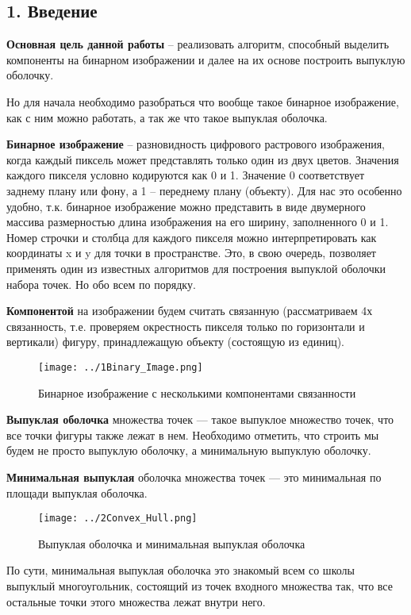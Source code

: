 \documentclass{report}
\begin{document}
\setcounter{page}{2}
\tableofcontents

\newpage


\begin{center}
\section*{1. Введение}
\end{center}
\par \textbf{Основная цель данной работы} – реализовать алгоритм, способный выделить компоненты на бинарном изображении и далее на их основе построить выпуклую оболочку.
\par Но для начала необходимо разобраться что вообще такое бинарное изображение, как с ним можно работать, а так же что такое выпуклая оболочка.
\par \textbf{Бинарное изображение} – разновидность цифрового растрового изображения, когда каждый пиксель может представлять только один из двух цветов. Значения каждого пикселя условно кодируются как 0 и 1. Значение 0 соответствует заднему плану или фону, а 1 – переднему плану (объекту). Для нас это особенно удобно, т.к. бинарное изображение можно представить в виде двумерного массива размерностью длина изображения на его ширину, заполненного 0 и 1. Номер строчки и столбца для каждого пикселя можно интерпретировать как координаты x и y для точки в пространстве. Это, в свою очередь, позволяет применять один из известных алгоритмов для построения выпуклой оболочки набора точек. Но обо всем по порядку. 
\par \textbf{Компонентой} на изображении будем считать связанную (рассматриваем 4х связанность, т.е. проверяем окрестность пикселя только по горизонтали и вертикали) фигуру, принадлежащую объекту (состоящую из единиц). 
\begin{figure}[htbp]
  \centering
  \texttt{[image: ../1Binary\_Image.png]}
  \caption{Бинарное изображение с несколькими компонентами связанности}\label{fig:../1Binary_Image.png}
\end{figure}
\par \textbf{Выпуклая оболочка} множества точек — такое выпуклое множество точек, что все точки фигуры также лежат в нем. Необходимо отметить, что строить мы будем не просто выпуклую оболочку, а минимальную выпуклую оболочку.
\par \textbf{Минимальная выпуклая} оболочка множества точек — это минимальная по площади выпуклая оболочка.
\begin{figure}[htbp]
  \centering
  \texttt{[image: ../2Convex\_Hull.png]}
  \caption{Выпуклая оболочка и минимальная выпуклая оболочка}\label{fig:../2Convex_Hull.png}
\end{figure}
\par По сути, минимальная выпуклая оболочка это знакомый всем со школы выпуклый многоугольник, состоящий из точек входного множества так, что все остальные точки этого множества лежат внутри него.
 
\end{document}
